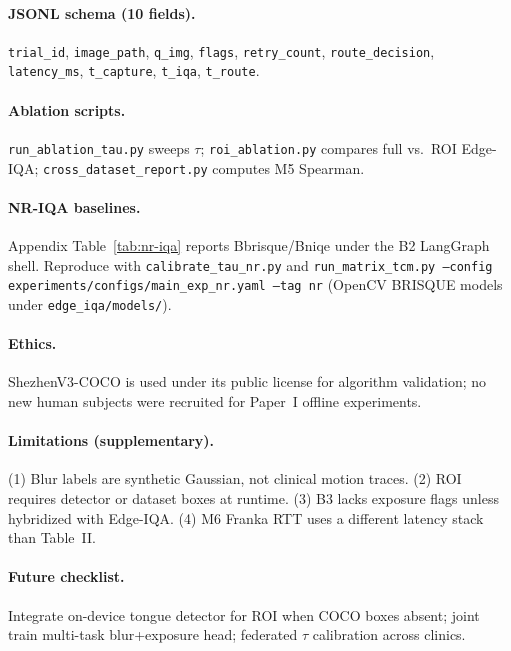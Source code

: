 \paragraph{JSONL schema (10 fields).}
\texttt{trial\_id}, \texttt{image\_path}, \texttt{q\_img}, \texttt{flags}, \texttt{retry\_count}, \texttt{route\_decision}, \texttt{latency\_ms}, \texttt{t\_capture}, \texttt{t\_iqa}, \texttt{t\_route}.

\paragraph{Ablation scripts.}
\texttt{run\_ablation\_tau.py} sweeps $\tau$; \texttt{roi\_ablation.py} compares full vs.\ ROI Edge-IQA; \texttt{cross\_dataset\_report.py} computes M5 Spearman.

\paragraph{NR-IQA baselines.}
Appendix Table~\ref{tab:nr-iqa} reports Bbrisque/Bniqe under the B2 LangGraph shell.
Reproduce with \texttt{calibrate\_tau\_nr.py} and \texttt{run\_matrix\_tcm.py --config experiments/configs/main\_exp\_nr.yaml --tag nr} (OpenCV BRISQUE models under \texttt{edge\_iqa/models/}).

\paragraph{Ethics.}
ShezhenV3-COCO is used under its public license for algorithm validation; no new human subjects were recruited for Paper~I offline experiments.

\paragraph{Limitations (supplementary).}
(1) Blur labels are synthetic Gaussian, not clinical motion traces.
(2) ROI requires detector or dataset boxes at runtime.
(3) B3 lacks exposure flags unless hybridized with Edge-IQA.
(4) M6 Franka RTT uses a different latency stack than Table~II.

\paragraph{Future checklist.}
Integrate on-device tongue detector for ROI when COCO boxes absent; joint train multi-task blur+exposure head; federated $\tau$ calibration across clinics.

